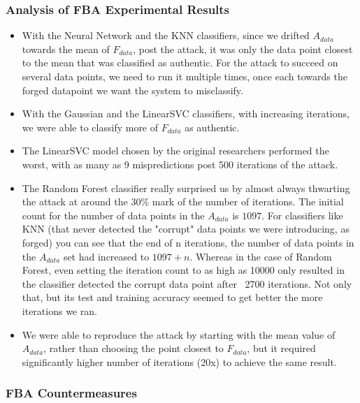 \documentclass{article}
\begin{document}
\subsubsection{Analysis of FBA Experimental Results}

\begin{itemize}
\item With the Neural Network and the KNN classifiers, since we drifted $A_{data}$ towards the mean of $F_{data}$, post the attack, it was only the data point closest to the mean that was classified as authentic. For the attack to succeed on several data points, we need to run it multiple times, once each towards the forged datapoint we want the system to misclassify.
\item With the Gaussian and the LinearSVC classifiers, with increasing iterations, we were able to classify more of $F_{data}$ as authentic. 
\item The LinearSVC model chosen by the original researchers performed the worst, with as many as 9 mispredictions post 500 iterations of the attack.
\item The Random Forest classifier really surprised us by almost always thwarting the attack at around the 30\% mark of the number of iterations. The initial count for the number of data points in the $A_{data}$ is $1097$. For classifiers like KNN (that never detected the "corrupt" data points we were introducing, as forged) you can see that the end of n iterations, the number of data points in the $A_{data}$ set had increased to $1097 + n$. Whereas in the case of Random Forest, even setting the iteration count to as high as 10000 only resulted in the classifier detected the corrupt data point after ~2700 iterations. Not only that, but its test and training accuracy seemed to get better the more iterations we ran.
\item We were able to reproduce the attack by starting with the mean value of $A_{data}$, rather than choosing the point closest to $F_{data}$, but it required significantly higher number of iterations (20x) to achieve the same result.
\end{itemize}

\subsubsection{FBA Countermeasures}
\end{document}
